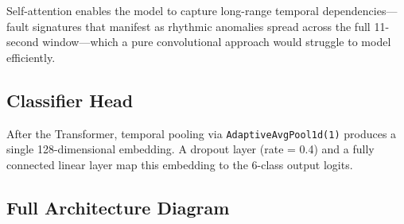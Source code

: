 \documentclass[12pt,a4paper]{article}
\begin{document}
Self-attention enables the model to capture long-range temporal dependencies—fault signatures that manifest as rhythmic anomalies spread across the full 11-second window—which a pure convolutional approach would struggle to model efficiently.

\subsection{Classifier Head}

After the Transformer, temporal pooling via \texttt{AdaptiveAvgPool1d(1)} produces a single 128-dimensional embedding. A dropout layer (rate = 0.4) and a fully connected linear layer map this embedding to the 6-class output logits.

\subsection{Full Architecture Diagram}
\end{document}
